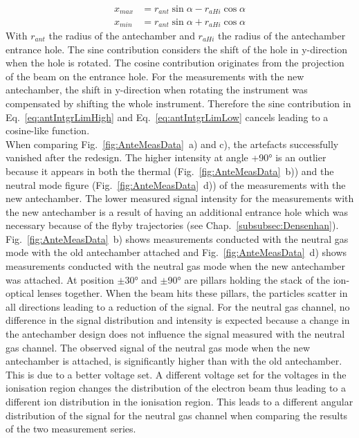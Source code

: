 	\begin{align}
		x_{max} &= r_{ant}\sin{\alpha} - r_{aHi}\cos{\alpha}\label{eq:antIntgrLimHigh}\\
		x_{min} &= r_{ant}\sin{\alpha} + r_{aHi}\cos{\alpha}\label{eq:antIntgrLimLow}
	\end{align}
	With $r_{ant}$ the radius of the antechamber and $r_{aHi}$ the radius of the antechamber entrance hole. The sine contribution considers the shift of the hole in y-direction when the hole is rotated. The cosine contribution originates from the projection of the beam on the entrance hole. For the measurements with the new antechamber, the shift in y-direction when rotating the instrument was compensated by shifting the whole instrument. Therefore the sine contribution in Eq.~\eqref{eq:antIntgrLimHigh} and Eq.~\eqref{eq:antIntgrLimLow} cancels leading to a cosine-like function.\\
	When comparing Fig.~\ref{fig:AnteMeasData}~a) and c), the artefacts successfully vanished after the redesign. The higher intensity at angle +90° is an outlier because it appears in both the thermal (Fig.~\ref{fig:AnteMeasData}~b)) and the neutral mode figure (Fig.~\ref{fig:AnteMeasData}~d)) of the measurements with the new antechamber. The lower measured signal intensity for the measurements with the new antechamber is a result of having an additional entrance hole which was necessary because of the flyby trajectories (see Chap.~\ref{subsubsec:Densenhan}).\\
	Fig.~\ref{fig:AnteMeasData}~b) shows measurements conducted with the neutral gas mode with the old antechamber attached and Fig.~\ref{fig:AnteMeasData}~d) shows measurements conducted with the neutral gas mode when the new antechamber was attached. At position $\pm$30° and $\pm$90° are pillars holding the stack of the ion-optical lenses together. When the beam hits these pillars, the particles scatter in all directions leading to a reduction of the signal. For the neutral gas channel, no difference in the signal distribution and intensity is expected because a change in the antechamber design does not influence the signal measured with the neutral gas channel. The observed signal of the neutral gas mode when the new antechamber is attached, is significantly higher than with the old antechamber. This is due to a better voltage set. A different voltage set for the voltages in the ionisation region changes the distribution of the electron beam thus leading to a different ion distribution in the ionisation region. This leads to a different angular distribution of the signal for the neutral gas channel when comparing the results of the two measurement series. 
	

